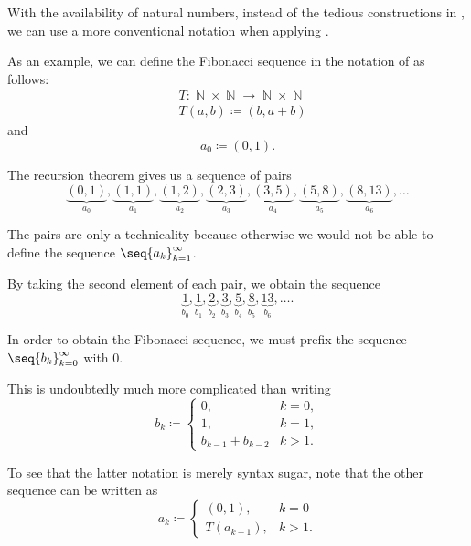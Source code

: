 \begin{remark}\label{rem:natural_number_recursion}
  With the availability of natural numbers, instead of the tedious constructions in , we can use a more conventional notation when applying .

  As an example, we can define the Fibonacci sequence in the notation of  as follows:
  \begin{equation*}
    \begin{aligned}
      &T: \BbbN \times \BbbN \to \BbbN \times \BbbN \\
      &T(a, b) \coloneqq (b, a + b)
    \end{aligned}
  \end{equation*}
  and
  \begin{equation*}
    a_0 \coloneqq (0, 1).
  \end{equation*}

  The recursion theorem gives us a sequence of pairs
  \begin{equation*}
    \underbrace{(0, 1)}_{a_0}, \underbrace{(1, 1)}_{a_1}, \underbrace{(1, 2)}_{a_2}, \underbrace{(2, 3)}_{a_3}, \underbrace{(3, 5)}_{a_4}, \underbrace{(5, 8)}_{a_5}, \underbrace{(8, 13)}_{a_6}, \ldots
  \end{equation*}

  The pairs are only a technicality because otherwise we would not be able to define the sequence \( \seq{ a_k }_{k=1}^\infty \).

  By taking the second element of each pair, we obtain the sequence
  \begin{equation*}
    \underbrace{1}_{b_0}, \underbrace{1}_{b_1}, \underbrace{2}_{b_2}, \underbrace{3}_{b_3}, \underbrace{5}_{b_4}, \underbrace{8}_{b_5}, \underbrace{13}_{b_6}, \ldots.
  \end{equation*}

  In order to obtain the Fibonacci sequence, we must prefix the sequence \( \seq{ b_k }_{k=0}^\infty \) with \( 0 \).

  This is undoubtedly much more complicated than writing
  \begin{equation*}
    b_k \coloneqq \begin{cases}
      0,                &k = 0, \\
      1,                &k = 1, \\
      b_{k-1} + b_{k-2} &k > 1.
    \end{cases}
  \end{equation*}

  To see that the latter notation is merely syntax sugar, note that the other sequence can be written as
  \begin{equation*}
    a_k \coloneqq \begin{cases}
      (0, 1),     &k = 0 \\
      T(a_{k-1}), &k > 1.
    \end{cases}
  \end{equation*}
\end{remark}
